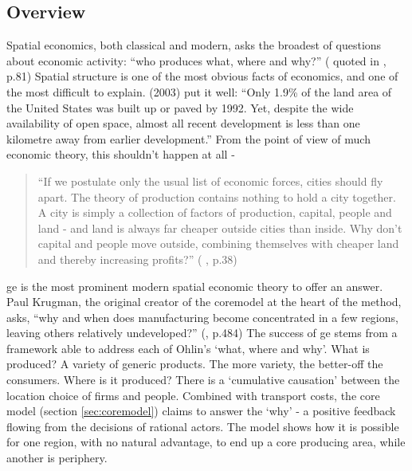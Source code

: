 \subsection{Overview \label{sec:overview}}
Spatial economics, both classical and modern, asks the broadest of questions about economic activity: ``who produces what, where and why?'' (\citealt{ohlin_interregional_1933} quoted in \citeauthor{brakman_new_2009}, p.81)  Spatial structure is one of the most obvious facts of economics, and one of the most difficult to explain. \citeauthor{duranton_micro-foundations_2003} (2003) put it well: ``Only 1.9\% of the land area of the United States was built up or paved by 1992. Yet, despite the wide availability of open space, almost all recent development is less than one kilometre away from earlier development.'' From the point of view of much economic theory, this shouldn't happen at all -

\begin{quote}``If we postulate only the usual list of economic forces, cities should fly apart. The theory of production contains nothing to hold a city together. A city is simply a collection of factors of production, capital, people and land - and land is always far cheaper outside cities than inside. Why don't capital and people move outside, combining themselves with cheaper land and thereby increasing profits?'' (\citealt{lucas_mechanics_1988} , p.38)
\end{quote}

\gls{ge} is the most prominent modern spatial economic theory to offer an answer. Paul Krugman, the original creator of the \gls{coremodel} at the heart of the method, asks, ``why and when does manufacturing become concentrated in a few regions, leaving others relatively undeveloped?'' (\citealt{krugman_increasing_1991}, p.484) The success of \gls{ge} stems from a framework able to address each of Ohlin's `what, where and why'. What is produced? A variety of generic products. The more variety, the better-off the consumers. Where is it produced? There is a `cumulative causation' between the location choice of firms and people. Combined with transport costs, the core model (section \ref{sec:coremodel}) claims to answer the `why' - a positive feedback flowing from the decisions of rational actors. The model shows how it is possible for one region, with no natural advantage, to end up a core producing area, while another is periphery.

